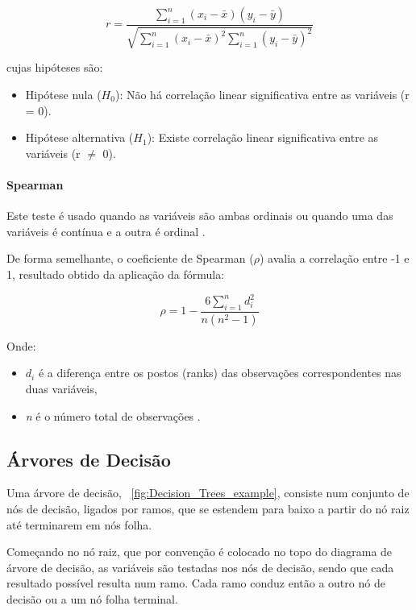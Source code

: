\documentclass[conference]{IEEEtran}
\begin{document}
\begin{equation}
r = \frac{\sum_{i=1}^{n} (x_i - \bar{x})(y_i - \bar{y})}
{\sqrt{\sum_{i=1}^{n} (x_i - \bar{x})^2 \sum_{i=1}^{n} (y_i - \bar{y})^2}} \label{pearsonEq}
\end{equation}

cujas hipóteses são:
\begin{itemize}
\item Hipótese nula ($H_0$): Não há correlação linear significativa entre as variáveis (r = 0).
\item Hipótese alternativa ($H_1$): Existe correlação linear significativa entre as variáveis (r $\neq$ 0).
\end{itemize}

\medskip
\paragraph{Spearman}

Este teste é usado quando as variáveis são ambas ordinais ou quando uma das variáveis é contínua e a outra é ordinal \cite{madureira2024}.

De forma semelhante, o coeficiente de Spearman ($\rho$) avalia a correlação entre -1 e 1, resultado obtido da aplicação da fórmula:

\begin{equation}
	\label{eq:spearman}
	\rho = 1 - \frac{6 \sum_{i=1}^n d_i^2}{n(n^2-1)}
\end{equation}

Onde:
\begin{itemize}

\item $d_i$ é a diferença entre os postos (ranks) das observações correspondentes nas duas variáveis,

\item \textit{n} é o número total de observações \cite{zar2005}.

\end{itemize}

\subsection{Árvores de Decisão}

Uma árvore de decisão,  \figurename~\ref{fig:Decision_Trees_example},  consiste num conjunto de nós de decisão, ligados por ramos, que se estendem para baixo a partir do nó raiz até terminarem em nós folha. 

Começando no nó raiz, que por convenção é colocado no topo do diagrama de árvore de decisão, as variáveis são testadas nos nós de decisão, sendo que cada resultado possível resulta num ramo. Cada ramo conduz então a outro nó de decisão ou a um nó folha terminal. 
\end{document}
